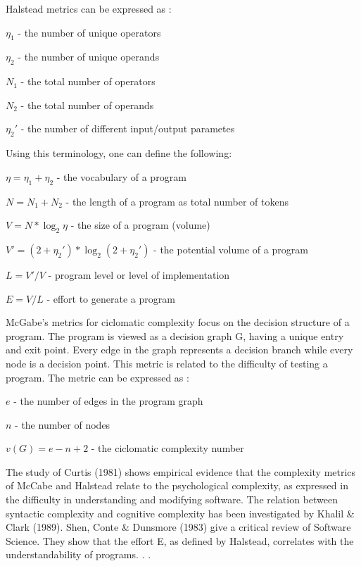 \documentclass{article}
\begin{document}
Halstead metrics can be expressed as :

\begin{center}
$\eta_1$ - the number of unique operators \par
$\eta_2$ - the number of unique operands \par
$N_1$ - the total number of operators \par
$N_2$ - the total number of operands \par
$\eta_2'$ - the number of different input/output parametes \par
\end{center}

Using this terminology, one can define the following:\par
\begin{center}
$\eta = \eta_1 + \eta_2 $ - the vocabulary of a program \par
$N = N_1 + N_2 $ - the length of a program as total number of tokens \par
$V = N * \log _2 \eta $ - the size of a program (volume) \par
$V' = (2 + \eta_2')*\log_2(2 + \eta_2')$ - the potential volume of a program \par
$L = V' / V $ - program level or level of implementation \par
$E = V / L $ - effort to generate a program
\end{center}

McGabe's metrics for ciclomatic complexity focus on the decision structure of a program. The program is viewed as a decision graph G, having a unique entry and exit point. Every edge in the graph represents a decision branch while every node is a decision point. This metric is related to the difficulty of testing a program. The metric can be expressed as :
\begin{center}
$e$ - the number of edges in the program graph \par
$n$ - the number of nodes \par
$v(G) = e - n + 2$ - the ciclomatic complexity number
\end{center}

The study of Curtis (1981) shows empirical evidence that the complexity metrics of McCabe and Halstead relate to the psychological complexity, as expressed in the difficulty in understanding and modifying software. The relation between syntactic complexity and cognitive complexity has been investigated by Khalil \& Clark (1989). Shen, Conte \& Dunsmore (1983) give a critical review of Software Science. They show that the effort E, as defined by Halstead, correlates with the understandability of programs. . \cite{DBLP:journals/infsof/BergB95}. \par
\end{document}
